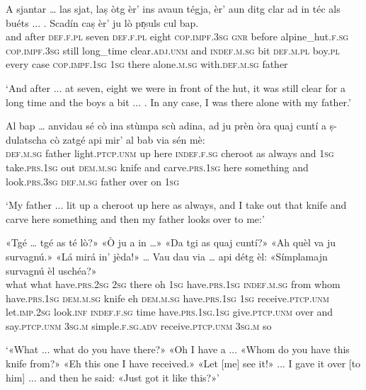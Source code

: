 \begin{linenumbers}
	\gll A sjantar … las sjat, laṣ òtg èr’ ins avaun tégja, èr’ aun ditg clar ad in téc als buéts\footnotemark{} ... . Scadín caṣ èr’ ju lò pr̩suls cul bap.   \\
	and after {} \textsc{def.f.pl} seven \textsc{def.f.pl} eight \textsc{cop.impf.3sg} \textsc{gnr} before alpine\_hut.\textsc{f.sg} \textsc{cop.impf.3sg} still long\_time clear.\textsc{adj.unm} and \textsc{indef.m.sg} bit \textsc{def.m.pl} boy.\textsc{pl} {} {} every case \textsc{cop.impf.1sg} \textsc{1sg} there alone.\textsc{m.sg} with.\textsc{def.m.sg} father\\
\end{linenumbers}
\medskip
\glt `And after ... at seven, eight we were in front of the hut, it was still clear for a long time and the boys a bit ... . In any case, I was there alone with my father.'
\medskip

\begin{linenumbers}
	\gll  Al bap … anvidau sé cò ina stùmpa scù adina, ad ju prèn òra quaj cuntí a ṣ-dulatscha cò zatgé api mir’ al bab via sén mè:\\
	\textsc{def.m.sg} father {} light.\textsc{ptcp.unm} up here \textsc{indef.f.sg} cheroot as always and \textsc{1sg} take.\textsc{prs.1sg} out \textsc{dem.m.sg} knife and carve.\textsc{prs.1sg} here something and look.\textsc{prs.3sg} \textsc{def.m.sg} father over on \textsc{1sg} \\
\end{linenumbers}
\medskip
\glt `My father ... lit up a cheroot up here as always, and I take out that knife and carve here something and then my father looks over to me:'
\medskip

\begin{linenumbers}
	\gll  «Tgé … tgé as té lò?» «Ò ju a in …» «Da tgi as quaj cuntí?» «Ah quèl va ju survagnú.» «Lá mirá in' jèda!» … Vau dau via … api détg èl: «Símplamajn survagnú èl uschéa?» \\
	what {} what have.\textsc{prs.2sg} \textsc{2sg} there oh \textsc{1sg} have.\textsc{prs.1sg} \textsc{indef.m.sg} {} from whom have.\textsc{prs.1sg} \textsc{dem.m.sg} knife eh \textsc{dem.m.sg} have.\textsc{prs.1sg} \textsc{1sg} receive.\textsc{ptcp.unm} let.\textsc{imp.2sg} look.\textsc{inf} \textsc{indef.f.sg} time {} have.\textsc{prs.1sg.1sg} give.\textsc{ptcp.unm} over {} and say.\textsc{ptcp.unm} \textsc{3sg.m} simple.\textsc{f.sg.adv} receive.\textsc{ptcp.unm} \textsc{3sg.m} so  \\
\end{linenumbers}
\medskip
\glt `«What ... what do you have there?» «Oh I have a ... «Whom do you have this knife from?» «Eh this one I have received.» «Let [me] see it!» ... I gave it over [to him] ... and then he said: «Just got it like this?»'
\medskip

